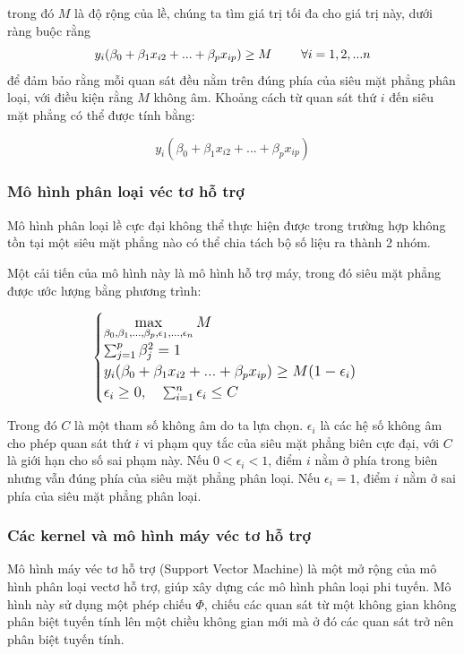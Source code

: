 \documentclass[a4paper]{report}\usepackage[]{graphicx}\usepackage[]{color}
\begin{document}
trong đó $M$ là độ rộng của lề, chúng ta tìm giá trị tối đa cho giá trị này, dưới ràng buộc rằng 
 $$
\large
y_i(\beta_0 + \beta_1x_{i2} + ... + \beta_px_{ip}) \geq M \qquad \forall i = 1, 2, ...n
$$
để đảm bảo rằng mỗi quan sát đều nằm trên đúng phía của siêu mặt phẳng phân loại, với điều kiện rằng $M$ không âm.
Khoảng cách từ quan sát thứ $i$ đến siêu mặt phẳng có thể được tính bằng: 

$$
y_i(\beta_0 + \beta_1x_{i2} + ... + \beta_px_{ip})
$$


\subsubsection{Mô hình phân loại véc tơ hỗ trợ}

Mô hình phân loại lề cực đại không thể thực hiện được trong trường hợp không tồn tại một siêu mặt phẳng nào có thể chia tách bộ số liệu ra thành 2 nhóm.

Một cải tiến của mô hình này là mô hình hỗ trợ máy, trong đó siêu mặt phẳng được ước lượng bằng phương trình:

$$
\large
\begin{cases}
\max\limits_{\beta_0, \beta_1,...,\beta_p, \epsilon_1, ... , \epsilon_n}M\\

\sum_{j = 1}^p \beta_j^2 = 1\\

y_i(\beta_0 + \beta_1x_{i2} + ... + \beta_px_{ip}) \geq M(1-\epsilon_i) \\

\epsilon_i \geq 0, \quad \sum_{i = 1}^n \epsilon_i \leq C
\end{cases}
$$

Trong đó $C$ là một tham số không âm do ta lựa chọn. $\epsilon_i$ là các hệ số không âm cho phép quan sát thứ $i$ vi phạm quy tắc của siêu mặt phẳng biên cực đại, với $C$ là giới hạn cho số sai phạm này. Nếu $0 < \epsilon_i < 1$, điểm $i$ nằm ở phía trong biên nhưng vẫn đúng phía của siêu mặt phẳng phân loại. Nếu $\epsilon_i = 1$, điểm $i$ nằm ở sai phía của siêu mặt phẳng phân loại.

\subsubsection{Các kernel và mô hình máy véc tơ hỗ trợ}

Mô hình máy véc tơ hỗ trợ (Support Vector Machine) là một mở rộng của mô hình phân loại vectơ hỗ trợ, giúp xây dựng các mô hình phân loại phi tuyến. Mô hình này sử dụng một phép chiếu $\Phi$, chiếu các quan sát từ một không gian không phân biệt tuyến tính lên một chiều không gian mới mà ở đó các quan sát trở nên phân biệt tuyến tính.
\end{document}
